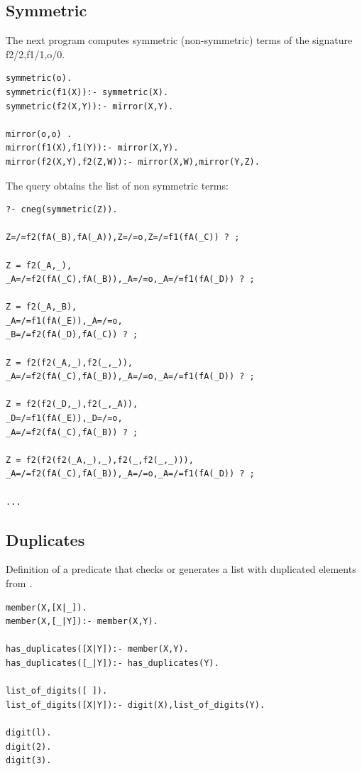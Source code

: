 \documentclass{tlp}
\begin{document}
\subsection*{Symmetric}

The next program computes symmetric (non-symmetric) terms of the signature
{f2/2,f1/1,o/0}. 
\begin{small}
\begin{verbatim}
symmetric(o). 
symmetric(f1(X)):- symmetric(X).
symmetric(f2(X,Y)):- mirror(X,Y).

mirror(o,o) .
mirror(f1(X),f1(Y)):- mirror(X,Y).
mirror(f2(X,Y),f2(Z,W)):- mirror(X,W),mirror(Y,Z).
\end{verbatim}
\end{small}

The query obtains the list of non symmetric terms:
\begin{small}
\begin{verbatim}
?- cneg(symmetric(Z)).

Z=/=f2(fA(_B),fA(_A)),Z=/=o,Z=/=f1(fA(_C)) ? ;

Z = f2(_A,_),
_A=/=f2(fA(_C),fA(_B)),_A=/=o,_A=/=f1(fA(_D)) ? ;

Z = f2(_A,_B),
_A=/=f1(fA(_E)),_A=/=o,
_B=/=f2(fA(_D),fA(_C)) ? ;

Z = f2(f2(_A,_),f2(_,_)),
_A=/=f2(fA(_C),fA(_B)),_A=/=o,_A=/=f1(fA(_D)) ? ;

Z = f2(f2(_D,_),f2(_,_A)),
_D=/=f1(fA(_E)),_D=/=o,
_A=/=f2(fA(_C),fA(_B)) ? ;

Z = f2(f2(f2(_A,_),_),f2(_,f2(_,_))),
_A=/=f2(fA(_C),fA(_B)),_A=/=o,_A=/=f1(fA(_D)) ? ;

...
\end{verbatim}
\end{small}
\subsection*{Duplicates}

Definition of a predicate that checks or generates a list with duplicated
elements from \cite{Chan1}.
\begin{small}
\begin{verbatim}
member(X,[X|_]).
member(X,[_|Y]):- member(X,Y).

has_duplicates([X|Y]):- member(X,Y). 
has_duplicates([_|Y]):- has_duplicates(Y).

list_of_digits([ ]).
list_of_digits([X|Y]):- digit(X),list_of_digits(Y).

digit(l).
digit(2).
digit(3).
\end{verbatim}
\end{small}
\end{document}

